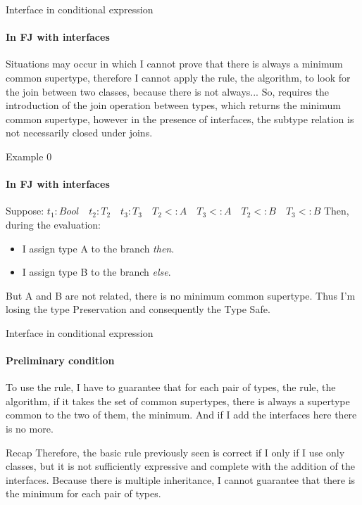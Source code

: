 \documentclass{beamer}
\begin{document}
\begin{frame}{Interface in conditional expression}
    \framesubtitle{In FJ with interfaces}
    Situations may occur in which I cannot prove that there is always a minimum common supertype, therefore I cannot apply the rule, the algorithm, to look for the join between two classes, because there is not always...\newline
 So, requires the introduction of the join operation between types, which returns the minimum common supertype, however in the presence of interfaces, the subtype relation is not necessarily closed under joins. 
\end{frame}

\begin{frame}{Example 0}
    \framesubtitle{In FJ with interfaces}
Suppose: $t_1 : Bool \quad t_2 : T_2 \quad t_3 : T_3 \quad T_2 <:A \quad T_3 <: A \quad T_2 <: B \quad T_3 <: B$
Then, during the evaluation:
\begin{itemize}
    \item I assign type A to the branch \textit{then}.
    \item I assign type B to the branch \textit{else}.
\end{itemize}
But A and B are not related, there is no minimum common supertype. Thus I'm losing the type Preservation and consequently the Type Safe.

\begin{center}
\end{center}
 \end{frame}

\begin{frame}{Interface in conditional expression}
\framesubtitle{Preliminary condition}
    To use the rule, I have to guarantee that for each pair of types, the rule, the algorithm, if it takes the set of common supertypes, there is always a supertype common to the two of them, the minimum.\newline
And if I add the interfaces here there is no more.
\end{frame}
\begin{frame}{Recap}
Therefore, the basic rule previously seen is correct if I only if I use only classes, but it is not sufficiently expressive and complete with the addition of the interfaces.\newline\newline
Because there is multiple inheritance, I cannot guarantee that there is the minimum for each pair of types.
    
\end{frame}
\end{document}
